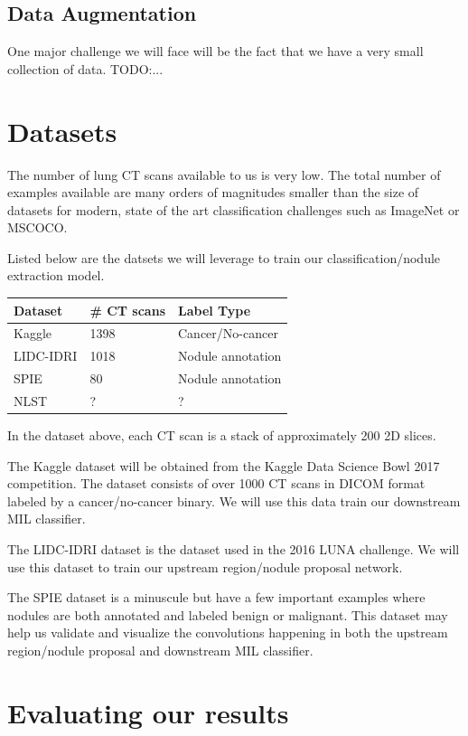 \documentclass[twocolumn,10pt]{article}
\newcommand{\red}[1]{{\color{red}#1}}
\newcommand{\temp}[1]{{\red{#1}\\}}
\begin{document}
\subsection{Data Augmentation}

One major challenge we will face will be the fact that we have a very small 
collection of data.
\temp{TODO:...}

\section{Datasets}
The number of lung CT scans available to us is very low. The total number of examples
available are many orders of magn{}itudes smaller than the size of datasets for modern,
state of the art classification challenges such as ImageNet or MSCOCO.

Listed below are the datsets we will leverage to train our classification/nodule
extraction model.

\begin{center}
\begin{tabular}{lll}
  \toprule
  Dataset & \# CT scans & Label Type\\
  \midrule
  Kaggle&1398&Cancer/No-cancer\\
  LIDC-IDRI&1018&Nodule annotation\\
  SPIE&80&Nodule annotation\\
  NLST&?&?\\
\end{tabular}
\end{center}

In the dataset above, each CT scan is a stack of 
approximately 200 2D slices.

The Kaggle dataset will be obtained from the Kaggle Data Science Bowl 2017
competition. The dataset consists of over 1000 CT scans in DICOM format labeled
by a cancer/no-cancer binary. We will use this data train our downstream
 MIL classifier.

The LIDC-IDRI dataset is the dataset used in the 2016 LUNA challenge. We will use
this dataset to train our upstream region/nodule proposal network.

The SPIE dataset is a minuscule but have a few important examples where nodules
are both annotated and labeled benign or malignant. This dataset may help us 
validate and visualize the convolutions happening in both the upstream
region/nodule proposal and downstream MIL classifier.

\section{Evaluating our results}
\end{document}

